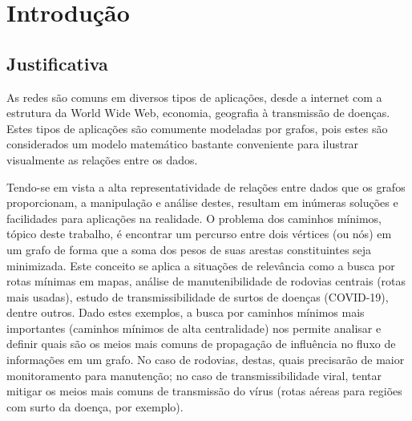 \chapter{Introdução}
\section{Justificativa}
As redes são comuns em diversos tipos de aplicações, desde a internet com a estrutura da World Wide Web, economia, geografia à transmissão de doenças. Estes tipos de aplicações são comumente modeladas por grafos, pois estes são considerados um modelo matemático bastante conveniente para ilustrar visualmente as relações entre os dados.

Tendo-se em vista a alta representatividade de relações entre dados que os grafos proporcionam, a manipulação e análise destes, resultam em inúmeras soluções e facilidades para aplicações na realidade. O problema dos caminhos mínimos, tópico deste trabalho, é encontrar um percurso entre dois vértices (ou nós) em um grafo de forma que a soma dos pesos de suas arestas constituintes seja minimizada. Este conceito se aplica a situações de relevância como a busca por rotas mínimas em mapas, análise de manutenibilidade de rodovias centrais (rotas mais usadas), estudo de transmissibilidade de surtos de doenças (COVID-19), dentre outros. Dado estes exemplos, a busca por caminhos mínimos mais importantes (caminhos mínimos de alta centralidade) nos permite analisar e definir quais são os meios mais comuns de propagação de influência no fluxo de informações em um grafo. No caso de rodovias, destas, quais precisarão de maior monitoramento para manutenção; no caso de transmissibilidade viral, tentar mitigar os meios mais comuns de transmissão do vírus (rotas aéreas para regiões com surto da doença, por exemplo).

